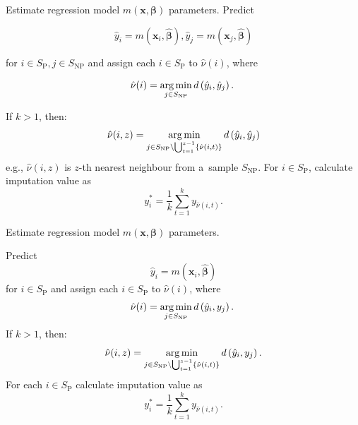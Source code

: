 \documentclass[
]{jss}
\begin{document}
\begin{algorithm}[ht!]
\caption{Mass imputation using predictive mean matching variant: $\hat{y}-\hat{y}$ matching}
\label{algo-3}
\begin{algorithmic}[1]
\State Estimate regression model $m(\boldsymbol{x}, \boldsymbol{\beta})$ parameters.\;
\State Predict 

$$\hat{y}_{i}=m\left(\boldsymbol{x}_{i},\hat{\boldsymbol{\beta}}\right),  \hat{y}_{j}=m\left(\boldsymbol{x}_{j},\hat{\boldsymbol{\beta}}\right)$$

for $i\in S_{\text{P}}, j\in S_{\text{NP}}$ and assign each  $i\in S_{\text{P}}$ to $\hat{\nu}(i)$, where

$$
\hat{\nu}(i)=
\operatornamewithlimits{arg\,min}_{j\in S_{\text{NP}}}d\left(\hat{y}_{i},\hat{y}_{j}\right).\;
$$ 

\State If $k>1$, then:
$$
\hat{\nu}(i, z) = \operatornamewithlimits{arg\,min}_{ j\in S_{\text{NP}}\setminus\bigcup_{t=1}^{z-1}
\{\hat{\nu}(i, t)\}} d\left(\hat{y}_{i},\hat{y}_{j}\right)
$$
e.g., $\hat{\nu}(i, z)$ is $z$-th nearest neighbour from a~sample $S_{\text{NP}}$.\;
\State For $i \in S_{\text{P}}$, calculate imputation value as 
$$
y_i^* = \frac{1}{k}\sum_{t=1}^{k}y_{\hat{\nu}(i, t)}.
$$
\end{algorithmic}
\end{algorithm}

\begin{algorithm}[ht!]
\caption{Mass imputation using predictive mean matching variant: $\hat{y}-y$ matching}
\label{algo-4}
\begin{algorithmic}[1]

\State Estimate regression model $m(\boldsymbol{x}, \boldsymbol{\beta})$ parameters.\;

\State Predict 
$$
\hat{y}_{i}=m\left(\boldsymbol{x}_{i},\hat{\boldsymbol{\beta}}\right)
$$  for $i \in S_{\text{P}}$ 
and assign each  $i \in S_{\text{P}}$ to $\hat{\nu}(i)$, where
$$
\hat{\nu}(i)=
\operatornamewithlimits{arg\,min}_{j \in S_{\text{NP}}}d\left(\hat{y}_{i},y_{j}\right).\;
$$
\State If $k>1$, then:
$$
\hat{\nu}(i, z) = \operatornamewithlimits{arg\,min}_{j \in S_{\text{NP}} \setminus \bigcup_{t=1}^{z-1}
\{\hat{\nu}(i, t)\}} d\left(\hat{y}_{i},y_{j}\right).
$$
\State For each $i \in S_{\text{P}}$ calculate imputation value as
$$
y_i^* = \frac{1}{k}\sum_{t=1}^{k}y_{\hat{\nu}(i, t)}.
$$
\end{algorithmic}
\end{algorithm}
\end{document}

